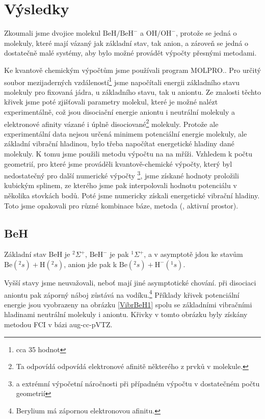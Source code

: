 \chapter{Výsledky}
Zkoumali jsme dvojice molekul $\mathrm{BeH/BeH^-}$ a $\mathrm{OH/OH^-}$, protože se jedná o 
molekuly, které mají vázaný jak základní stav, tak anion, a zároveň se jedná o 
dostatečně malé systémy, aby bylo možné provádět výpočty přesnými metodami.

Ke kvantově chemickým výpočtům jsme používali program MOLPRO.\cite{MOLPRO-WIREs, MOLPRO}. 
Pro určitý soubor mezijaderných vzdáleností\footnote{cca 35 hodnot} jsme napočítali 
energii základního stavu molekuly pro fixovaná jádra, u základního stavu, tak u 
aniontu. Ze znalosti těchto křivek jsme poté zjišťovali parametry molekul, které je 
možné nalézt experimentálně, což jsou disociační energie aniontu i neutrální molekuly a 
elektronové afinity vázané i úplně disociované\footnote{Ta odpovídá odpovídá 
elektronové afinitě některého z prvků v molekule.} molekuly. Protože ale experimentální 
data nejsou určená minimem potenciální energie molekuly, ale základní vibrační 
hladinou, bylo třeba napočítat energetické hladiny dané molekuly. K tomu jsme 
použili metodu výpočtu na na mříži. Vzhledem k počtu geometrií, pro které jsme 
prováděli kvantově-chemické výpočty, který byl nedostatečný pro další numerické výpočty
\footnote{a extrémní výpočetní náročnosti při případném výpočtu v dostatečném počtu 
geometrií}, jsme získané hodnoty proložili kubickým splinem, ze kterého jsme pak 
interpolovali hodnotu potenciálu v několika stovkách bodů. Poté jsme numericky získali 
energetické vibrační hladiny. Toto jsme opakovali pro různé kombinace báze, metoda (, 
aktivní prostor).

\section{BeH}
Základní stav BeH je $^2\Sigma^+$, $\mathrm{BeH}^-$ je pak $^1\Sigma^+$, a v asymptotě 
jdou ke stavům $\mathrm{Be}(^2s) + \mathrm{H}(^2s)$, anion jde pak k $\mathrm{Be}(^2s) + \mathrm{H^-}(^1s)$.

Vyšší stavy jsme neuvažovali, neboť mají jiné asymptotické chování.
při disociaci aniontu pak záporný náboj zůstává na vodíku.\footnote{Berylium má 
zápornou elektronovou afinitu.} Příklady křivek potenciální energie jsou vyobrazeny na obrázku  
\ref{VibrBeH1} spolu se základními vibračními hladinami neutrální molekuly i aniontu.
Křivky v tomto obrázku byly získány metodou FCI v bázi aug-cc-pVTZ.

